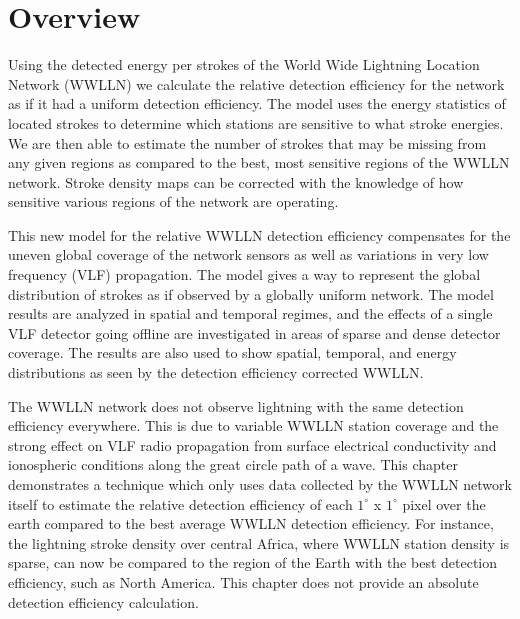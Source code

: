 \section{Overview}

Using the detected energy per strokes of the World Wide Lightning Location Network (WWLLN) we calculate the relative detection efficiency for the network as if it had a uniform  detection efficiency.
The model uses the energy statistics of located strokes to determine which stations are sensitive to what stroke energies.
We are then able to estimate the number of strokes that may be missing from any given regions as compared to the best, most sensitive regions of the WWLLN network.
Stroke density maps can be corrected with the knowledge of how sensitive various regions of the network are operating.

This new model for the relative WWLLN detection efficiency compensates for the uneven global coverage of the network sensors as well as variations in very low frequency (VLF) propagation.
The model gives a way to represent the global distribution of strokes as if observed by a globally uniform network.
The model results are analyzed in spatial and temporal regimes, and the effects of a single VLF detector going offline are investigated in areas of sparse and dense detector coverage.
The results are also used to show spatial, temporal, and energy distributions as seen by the detection efficiency corrected WWLLN.

The WWLLN network does not observe lightning with the same detection efficiency everywhere.
This is due to variable WWLLN station coverage and the strong effect on VLF radio propagation from surface electrical conductivity and ionospheric conditions along the great circle path of a wave.
This chapter demonstrates a technique which only uses data collected by the WWLLN network itself to estimate the relative detection efficiency of each $1^\circ$ x $1^\circ$ pixel over the earth compared to the best average WWLLN detection efficiency.
For instance, the lightning stroke density over central Africa, where WWLLN station density is sparse, can now be compared to the region of the Earth with the best detection efficiency, such as North America.
This chapter does not provide an absolute detection efficiency calculation.

